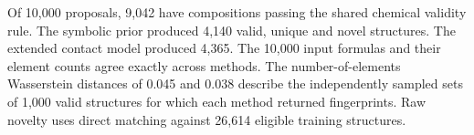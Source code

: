 Of 10,000 proposals, 9,042 have compositions passing the shared chemical validity rule. The symbolic prior produced 4,140 valid, unique and novel structures. The extended contact model produced 4,365. The 10,000 input formulas and their element counts agree exactly across methods. The number-of-elements Wasserstein distances of 0.045 and 0.038 describe the independently sampled sets of 1,000 valid structures for which each method returned fingerprints. Raw novelty uses direct matching against 26,614 eligible training structures.


